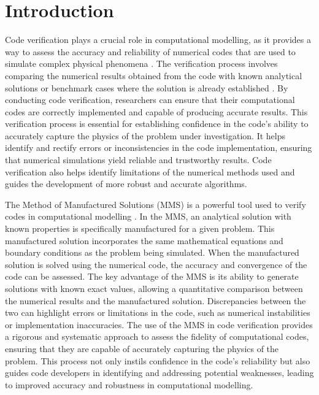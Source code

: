 \documentclass[preprint, 12pt]{elsarticle}
\begin{document}
\section{Introduction}
\label{sec:Introduction}

Code verification plays a crucial role in computational modelling, as it provides a way to assess the accuracy and reliability of numerical codes that are used to simulate complex physical phenomena \cite{Khoshghalb2019, Tranquilli2022}. The verification process involves comparing the numerical results obtained from the code with known analytical solutions or benchmark cases where the solution is already established \cite{Fernandes2018, Pedro2020}. By conducting code verification, researchers can ensure that their computational codes are correctly implemented and capable of producing accurate results. This verification process is essential for establishing confidence in the code's ability to accurately capture the physics of the problem under investigation. It helps identify and rectify errors or inconsistencies in the code implementation, ensuring that numerical simulations yield reliable and trustworthy results. Code verification also helps identify limitations of the numerical methods used and guides the development of more robust and accurate algorithms. 

The Method of Manufactured Solutions (MMS) is a powerful tool used to verify codes in computational modelling \cite{Roy2004, Habla2016, Muralha2020, Freno2021}. In the MMS, an analytical solution with known properties is specifically manufactured for a given problem. This manufactured solution incorporates the same mathematical equations and boundary conditions as the problem being simulated. When the manufactured solution is solved using the numerical code, the accuracy and convergence of the code can be assessed. The key advantage of the MMS is its ability to generate solutions with known exact values, allowing a quantitative comparison between the numerical results and the manufactured solution. Discrepancies between the two can highlight errors or limitations in the code, such as numerical instabilities or implementation inaccuracies. The use of the MMS in code verification provides a rigorous and systematic approach to assess the fidelity of computational codes, ensuring that they are capable of accurately capturing the physics of the problem. This process not only instils confidence in the code's reliability but also guides code developers in identifying and addressing potential weaknesses, leading to improved accuracy and robustness in computational modelling.
\end{document}
